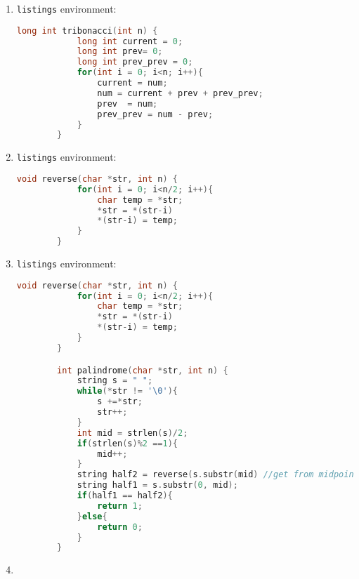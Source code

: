 \documentclass[11pt]{article}
\begin{document}
\begin{enumerate}[leftmargin=*]
    \item {\it }

    \verb|listings| environment:
    \begin{lstlisting}[language=C++]
        long int tribonacci(int n) {
            long int current = 0;
            long int prev= 0;
            long int prev_prev = 0;
            for(int i = 0; i<n; i++){
                current = num;
                num = current + prev + prev_prev;
                prev  = num;
                prev_prev = num - prev;
            }
        }
    \end{lstlisting}

    \item {\it }

    \verb|listings| environment:
    \begin{lstlisting}[language=C++]
        void reverse(char *str, int n) {
            for(int i = 0; i<n/2; i++){
                char temp = *str;
                *str = *(str-i)
                *(str-i) = temp;
            }
        }
    \end{lstlisting}

    \item {\it }

    \verb|listings| environment:
    \begin{lstlisting}[language=C++]
                void reverse(char *str, int n) {
            for(int i = 0; i<n/2; i++){
                char temp = *str;
                *str = *(str-i)
                *(str-i) = temp;
            }
        }

        int palindrome(char *str, int n) {
            string s = " ";
            while(*str != '\0'){
                s +=*str;
                str++;
            }
            int mid = strlen(s)/2;
            if(strlen(s)%2 ==1){
                mid++;
            }
            string half2 = reverse(s.substr(mid) //get from midpoint on and reverse that
            string half1 = s.substr(0, mid);
            if(half1 == half2){
                return 1;
            }else{
                return 0;
            }
        }
    \end{lstlisting}

    \item {\it }


\end{enumerate}
\end{document}
